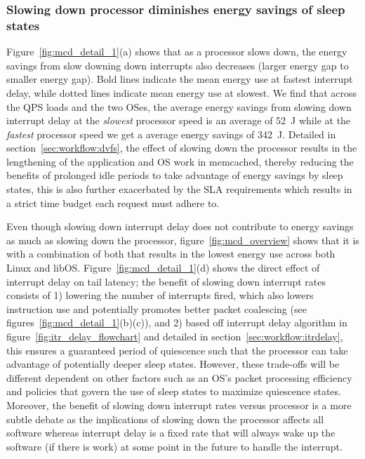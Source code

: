 \subsubsection{Slowing down processor diminishes energy savings of sleep states}
\label{sec:mcd:slowprocvssleep}
Figure~\ref{fig:mcd_detail_1}(a) shows that as a processor slows down, the energy savings from slow downing down interrupts also decreases (larger energy gap to smaller energy gap). Bold lines indicate the mean energy use at fastest interrupt delay, while dotted lines indicate mean energy use at slowest. We find that across the QPS loads and the two OSes, the average energy savings from slowing down interrupt delay at the \textit{slowest} processor speed is an average of \SI{52}{\joule} while at the \textit{fastest} processor speed we get a average energy savings of \SI{342}{\joule}. Detailed in section~\ref{sec:workflow:dvfs}, the effect of slowing down the processor results in the lengthening of the application and OS work in memcached, thereby reducing the benefits of prolonged idle periods to take advantage of energy savings by sleep states, this is also further exacerbated by the SLA requirements which results in a strict time budget each request must adhere to. 

Even though slowing down interrupt delay does not contribute to energy savings as much as slowing down the processor, figure~\ref{fig:mcd_overview} shows that it is  with a combination of both that results in the lowest energy use across both Linux and libOS. Figure~\ref{fig:mcd_detail_1}(d) shows the direct effect of interrupt delay on tail latency; the benefit of slowing down interrupt rates consists of 1) lowering the number of interrupts fired, which also lowers instruction use and potentially promotes better packet coalescing (see figures~\ref{fig:mcd_detail_1}(b)(c)), and 2) based off interrupt delay algorithm in figure~\ref{fig:itr_delay_flowchart} and detailed in section~\ref{sec:workflow:itrdelay}, this ensures a guaranteed period of quiescence such that the processor can take advantage of potentially deeper sleep states. However, these trade-offs will be different dependent on other factors such as an OS's packet processing efficiency and policies that govern the use of sleep states to maximize quiescence states. Moreover, the benefit of slowing down interrupt rates versus processor is a more subtle debate as the implications of slowing down the processor affects all software whereas interrupt delay is a fixed rate that will always wake up the software (if there is work) at some point in the future to handle the interrupt. 

